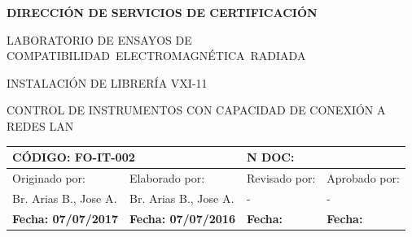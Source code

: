 \documentclass[paper=letter,oneside,fontsize=11pt, parskip=full]{scrartcl}
\begin{document}
			
		
		\begin{center}		
			
			\vspace{10cm}
			\begin{large}
				\bfseries
				\uppercase{Dirección de Servicios de Certificación}			
				\vspace{5pt}
				\begin{spacing}{0.9}
					\uppercase{Laboratorio de Ensayos de Compatibilidad~Electromagnética~Radiada}
				\end{spacing}
			\end{large}
			
			\vfill
			
			\begin{Large}
				\bfseries				
				\begin{spacing}{0.9}		
					\uppercase{Instalación de librería VXI-11}
				\end{spacing}
			\end{Large}	
				
			\vspace{5pt}
			
			\begin{large}						
				\uppercase{Control de instrumentos con capacidad de conexión a redes LAN}
			\end{large}	
			
			\vfill
			
			\begin{table}[!h]
				\begin{tabularx}{\linewidth}{|X|X|X|X|}	
					\hline				
					\multicolumn{2}{|l|}{\textbf{CÓDIGO}: FO-IT-002} & \multicolumn{2}{l|}{\textbf{N DOC:}} \\
					\hline
					Originado por:	& 	Elaborado por: & 
					Revisado por: 	& 	Aprobado por: \\
					\hline
					Br. Arias B., Jose A. & Br. Arias B., Jose A. & - & - \\
					\hline
					\textbf{Fecha: 07/07/2017 } & 
					\textbf{Fecha: 07/07/2016} & 
					\textbf{Fecha: } &
					\textbf{Fecha: } \\				
					\hline
				\end{tabularx}	
			\end{table}	
			
			\vfill
		
		\end{center}
	
\end{document}
